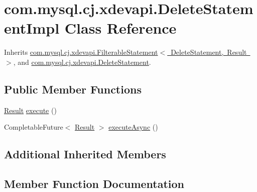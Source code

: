 \hypertarget{classcom_1_1mysql_1_1cj_1_1xdevapi_1_1_delete_statement_impl}{}\section{com.\+mysql.\+cj.\+xdevapi.\+Delete\+Statement\+Impl Class Reference}
\label{classcom_1_1mysql_1_1cj_1_1xdevapi_1_1_delete_statement_impl}


Inherits \mbox{\hyperlink{classcom_1_1mysql_1_1cj_1_1xdevapi_1_1_filterable_statement}{com.\+mysql.\+cj.\+xdevapi.\+Filterable\+Statement$<$ Delete\+Statement, Result $>$}}, and \mbox{\hyperlink{interfacecom_1_1mysql_1_1cj_1_1xdevapi_1_1_delete_statement}{com.\+mysql.\+cj.\+xdevapi.\+Delete\+Statement}}.

\subsection*{Public Member Functions}
\begin{DoxyCompactItemize}
\item 
\mbox{\hyperlink{interfacecom_1_1mysql_1_1cj_1_1xdevapi_1_1_result}{Result}} \mbox{\hyperlink{classcom_1_1mysql_1_1cj_1_1xdevapi_1_1_delete_statement_impl_af9c07b8df581500c17654da099165cec}{execute}} ()
\item 
Completable\+Future$<$ \mbox{\hyperlink{interfacecom_1_1mysql_1_1cj_1_1xdevapi_1_1_result}{Result}} $>$ \mbox{\hyperlink{classcom_1_1mysql_1_1cj_1_1xdevapi_1_1_delete_statement_impl_afc882987a4cfd437aa2b02685f10b3eb}{execute\+Async}} ()
\end{DoxyCompactItemize}
\subsection*{Additional Inherited Members}


\subsection{Member Function Documentation}
\mbox{\label{classcom_1_1mysql_1_1cj_1_1xdevapi_1_1_delete_statement_impl_af9c07b8df581500c17654da099165cec}} 
